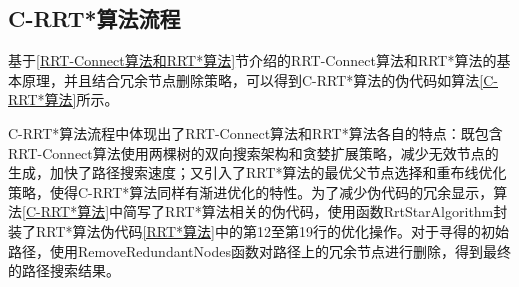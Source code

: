 \subsection{C-RRT*算法流程}

基于\ref{RRT-Connect算法和RRT*算法}节介绍的RRT-Connect算法和RRT*算法的基本原理，并且结合冗余节点删除策略，可以得到C-RRT*算法的伪代码如算法\ref{C-RRT*算法}所示。

C-RRT*算法流程中体现出了RRT-Connect算法和RRT*算法各自的特点：既包含RRT-Connect算法使用两棵树的双向搜索架构和贪婪扩展策略，减少无效节点的生成，加快了路径搜索速度；又引入了RRT*算法的最优父节点选择和重布线优化策略，使得C-RRT*算法同样有渐进优化的特性。为了减少伪代码的冗余显示，算法\ref{C-RRT*算法}中简写了RRT*算法相关的伪代码，使用函数RrtStarAlgorithm封装了RRT*算法伪代码\ref{RRT*算法}中的第12至第19行的优化操作。对于寻得的初始路径，使用RemoveRedundantNodes函数对路径上的冗余节点进行删除，得到最终的路径搜索结果。
